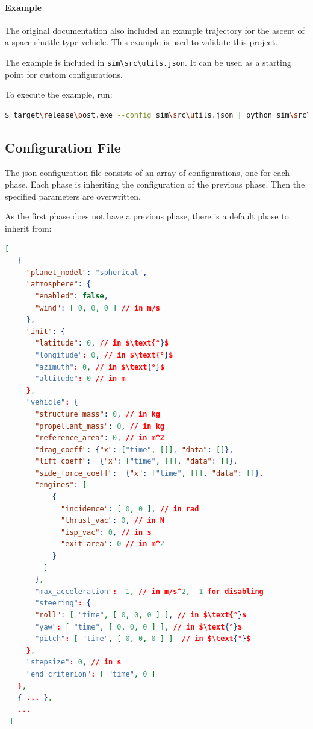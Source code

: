 \paragraph{Example}

The original documentation also included an example trajectory for the ascent
of a space shuttle type vehicle. This example is used to validate this
project.

The example is included in \lstinline{sim\src\utils.json}. It can be used as a starting point for custom configurations.

To execute the example, run:
\begin{lstlisting}[language=sh]
 $ target\release\post.exe --config sim\src\utils.json | python sim\src\utils\plot\plot.py
\end{lstlisting}

\subsection{Configuration File}\label{configuration-file}

The \gls{json} configuration file consists of an array of configurations, one for
each phase. Each phase is inheriting the configuration of the previous phase.
Then the specified parameters are overwritten.

As the first phase does not have a previous phase, there is a default phase to
inherit from:

\begin{lstlisting}[language=json,mathescape]
 [
   {
     "planet_model": "spherical",
     "atmosphere": {
       "enabled": false,
       "wind": [ 0, 0, 0 ] // in m/s
     },
     "init": {
       "latitude": 0, // in $\text{°}$
       "longitude": 0, // in $\text{°}$
       "azimuth": 0, // in $\text{°}$
       "altitude": 0 // in m
     },
     "vehicle": {
       "structure_mass": 0, // in kg
       "propellant_mass": 0, // in kg
       "reference_area": 0, // in m^2
       "drag_coeff": {"x": ["time", []], "data": []},
       "lift_coeff":  {"x": ["time", []], "data": []},
       "side_force_coeff":  {"x": ["time", []], "data": []},
       "engines": [
           {
             "incidence": [ 0, 0 ], // in rad
             "thrust_vac": 0, // in N
             "isp_vac": 0, // in s
             "exit_area": 0 // in m^2
           }
         ]
       },
       "max_acceleration": -1, // in m/s^2, -1 for disabling
       "steering": {
       "roll": [ "time", [ 0, 0, 0 ] ], // in $\text{°}$
       "yaw": [ "time", [ 0, 0, 0 ] ], // in $\text{°}$
       "pitch": [ "time", [ 0, 0, 0 ] ]  // in $\text{°}$
     },
     "stepsize": 0, // in s
     "end_criterion": [ "time", 0 ]
   },
   { ... },
   ...
 ]
\end{lstlisting}

